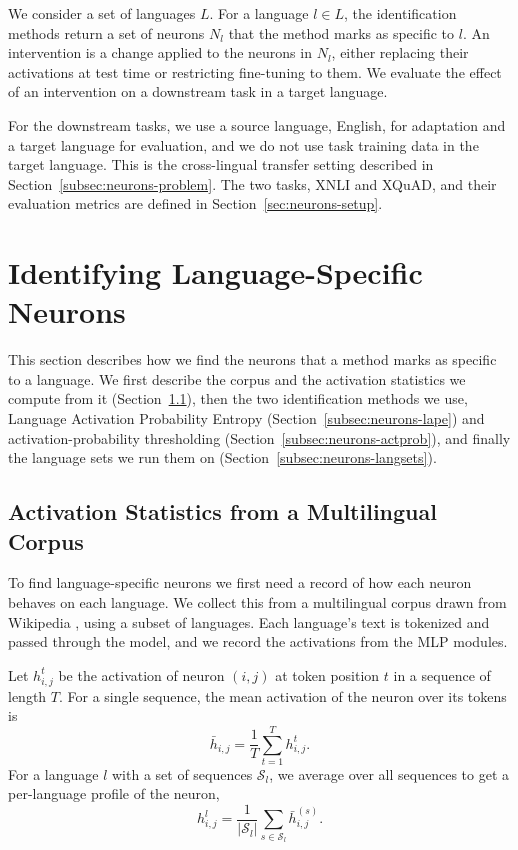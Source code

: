 We consider a set of languages $L$. For a language $l \in L$, the identification
methods return a set of neurons $N_l$ that the method marks as specific to $l$. An
intervention is a change applied to the neurons in $N_l$, either replacing their
activations at test time or restricting fine-tuning to them. We evaluate the
effect of an intervention on a downstream task in a target language.

For the downstream tasks, we use a source language, English, for adaptation and a
target language for evaluation, and we do not use task training data in the target
language. This is the cross-lingual transfer setting described in
Section~\ref{subsec:neurons-problem}. The two tasks, XNLI and XQuAD, and their
evaluation metrics are defined in Section~\ref{sec:neurons-setup}.

\section{Identifying Language-Specific Neurons}
\label{sec:neurons-identify}

This section describes how we find the neurons that a method marks as specific to
a language. We first describe the corpus and the activation statistics we compute
from it (Section~\ref{subsec:neurons-statistics}), then the two identification
methods we use, Language Activation Probability Entropy
(Section~\ref{subsec:neurons-lape}) and activation-probability thresholding
(Section~\ref{subsec:neurons-actprob}), and finally the language sets we run them
on (Section~\ref{subsec:neurons-langsets}).

\subsection{Activation Statistics from a Multilingual Corpus}
\label{subsec:neurons-statistics}

To find language-specific neurons we first need a record of how each neuron
behaves on each language. We collect this from a multilingual corpus drawn from
Wikipedia \citep{wikidump}, using a subset of languages. Each language's text is
tokenized and passed through the model, and we record the activations from the MLP
modules.

Let $h^{t}_{i,j}$ be the activation of neuron $(i,j)$ at token position $t$ in a
sequence of length $T$. For a single sequence, the mean activation of the neuron
over its tokens is
\begin{equation}
	\bar{h}_{i,j} = \frac{1}{T} \sum_{t=1}^{T} h^{t}_{i,j}.
	\label{eq:neurons-seqmean}
\end{equation}
For a language $l$ with a set of sequences $\mathcal{S}_l$, we average over all
sequences to get a per-language profile of the neuron,
\begin{equation}
	h^{l}_{i,j} = \frac{1}{|\mathcal{S}_l|} \sum_{s \in \mathcal{S}_l} \bar{h}^{(s)}_{i,j}.
	\label{eq:neurons-langmean}
\end{equation}


